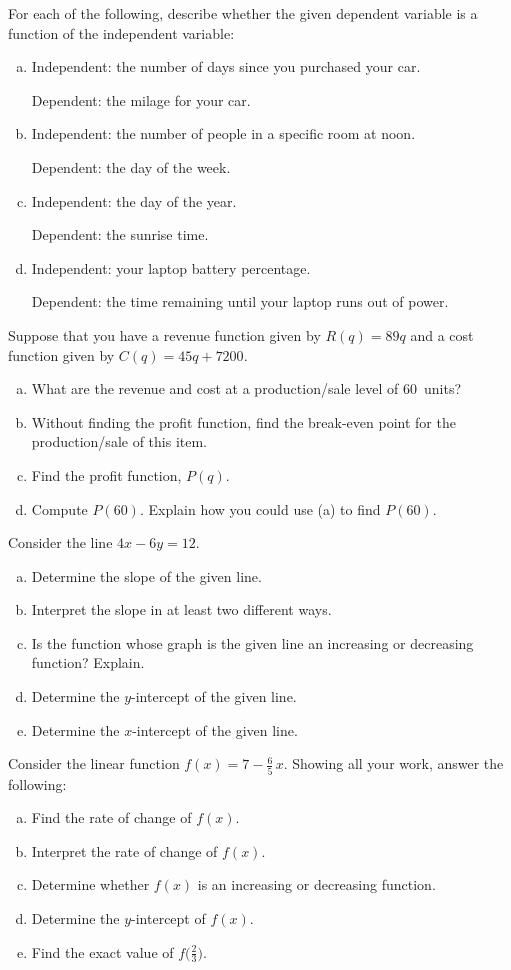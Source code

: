 \documentclass[11pt,letterpaper]{article}
\begin{document}
\prob For each of the following, describe whether the given dependent variable is a function of the independent variable:
	\begin{enumerate}[(a)]
	\item Independent: the number of days since you purchased your car. \par 
		Dependent: the milage for your car. 
	\item Independent: the number of people in a specific room at noon. \par 
		Dependent: the day of the week.
	\item Independent: the day of the year. \par
		Dependent: the sunrise time. 
	\item Independent: your laptop battery percentage. \par
		Dependent: the time remaining until your laptop runs out of power. 
	\end{enumerate} \pspace


\prob Suppose that you have a revenue function given by $R(q)= 89q$ and a cost function given by $C(q)= 45q + 7200$. 
	\begin{enumerate}[(a)]
	\item What are the revenue and cost at a production/sale level of 60~units?
	\item Without finding the profit function, find the break-even point for the production/sale of this item.
	\item Find the profit function, $P(q)$.
	\item Compute $P(60)$. Explain how you could use (a) to find $P(60)$. 
	\end{enumerate} \pspace


\prob Consider the line $4x - 6y= 12$.
	\begin{enumerate}[(a)]
	\item Determine the slope of the given line.
	\item Interpret the slope in at least two different ways.
	\item Is the function whose graph is the given line an increasing or decreasing function? Explain. 
	\item Determine the $y$-intercept of the given line. 
	\item Determine the $x$-intercept of the given line. 
	\end{enumerate} \pspace		


\prob Consider the linear function $f(x)= 7 - \frac{6}{5}\,x$. Showing all your work, answer the following:
	\begin{enumerate}[(a)]
	\item Find the rate of change of $f(x)$.
	\item Interpret the rate of change of $f(x)$. 
	\item Determine whether $f(x)$ is an increasing or decreasing function.
	\item Determine the $y$-intercept of $f(x)$.
	\item Find the exact value of $f \big( \frac{2}{3} \big)$. 
	\end{enumerate} \pspace
\end{document}
